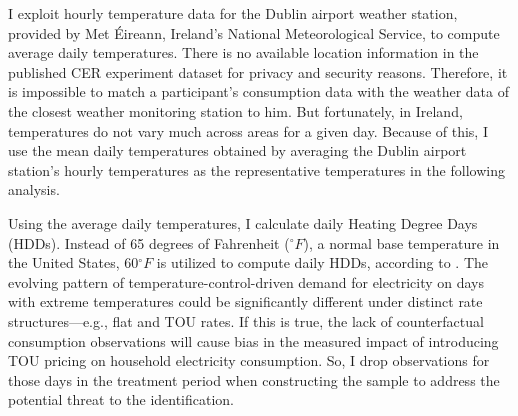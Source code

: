 I exploit hourly temperature data for the Dublin airport weather station, provided by Met \'{E}ireann, Ireland's National Meteorological Service, to compute average daily temperatures. There is no available location information in the published CER experiment dataset for privacy and security reasons. Therefore, it is impossible to match a participant's consumption data with the weather data of the closest weather monitoring station to him. But fortunately, in Ireland, temperatures do not vary much across areas for a given day. Because of this, I use the mean daily temperatures obtained by averaging the Dublin airport station's hourly temperatures as the representative temperatures in the following analysis. 

Using the average daily temperatures, I calculate daily Heating Degree Days (HDDs). Instead of 65 degrees of Fahrenheit ($^{\circ}F$), a normal base temperature in the United States, 60$^{\circ}F$ is utilized to compute daily HDDs, according to \cite{The-Impacts-of-Climate-Change-on-Domestic-Natural-Gas-Consumption-in-the-Greater-Dublin-Region_Liu-and-Sweeney_2012}. The evolving pattern of temperature-control-driven demand for electricity on days with extreme temperatures could be significantly different under distinct rate structures---e.g., flat and TOU rates. If this is true, the lack of counterfactual consumption observations will cause bias in the measured impact of introducing TOU pricing on household electricity consumption. So, I drop observations for those days in the treatment period when constructing the sample to address the potential threat to the identification. 
